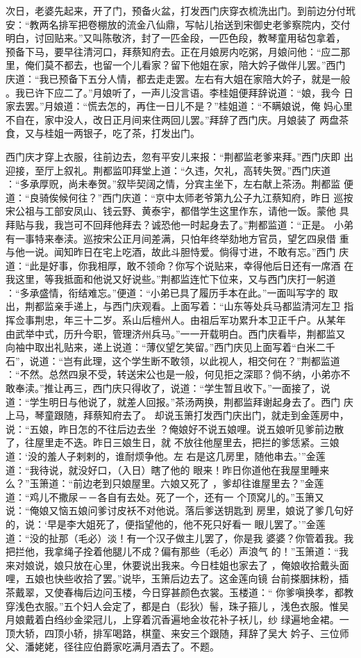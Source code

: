 次日，老婆先起来，开了门，预备火盆，打发西门庆穿衣梳洗出门。到前边分付玳
安：“教两名排军把卷棚放的流金八仙鼎，写帖儿抬送到宋御史老爹察院内，交付
明白，讨回贴来。”又叫陈敬济，封了一匹金段，一匹色段，教琴童用毡包拿着，
预备下马，要早往清河口，拜蔡知府去。正在月娘房内吃粥，月娘问他：“应二那
里，俺们莫不都去，也留一个儿看家？留下他姐在家，陪大妗子做伴儿罢。”西门
庆道：“我已预备下五分人情，都去走走罢。左右有大姐在家陪大妗子，就是一般
。我已许下应二了。”月娘听了，一声儿没言语。李桂姐便拜辞说道：“娘，我今
日家去罢。”月娘道：“慌去怎的，再住一日儿不是？”桂姐道：“不瞒娘说，俺
妈心里不自在，家中没人，改日正月间来住两回儿罢。”拜辞了西门庆。月娘装了
两盘茶食，又与桂姐一两银子，吃了茶，打发出门。

西门庆才穿上衣服，往前边去，忽有平安儿来报：“荆都监老爹来拜。”西门庆即
出迎接，至厅上叙礼。荆都监叩拜堂上道：“久违，欠礼，高转失贺。”西门庆道
：“多承厚贶，尚未奉贺。”叙毕契阔之情，分宾主坐下，左右献上茶汤。荆都监
便道：“良骑俟候何往？”西门庆道：“京中太师老爷第九公子九江蔡知府，昨日
巡按宋公祖与工部安凤山、钱云野、黄泰宇，都借学生这里作东，请他一饭。蒙他
具拜贴与我，我岂可不回拜他拜去？诚恐他一时起身去了。”荆都监道：“正是。
小弟有一事特来奉渎。巡按宋公正月间差满，只怕年终举劾地方官员，望乞四泉借
重与他一说。闻知昨日在宅上吃酒，故此斗胆恃爱。倘得寸进，不敢有忘。”西门
庆道：“此是好事，你我相厚，敢不领命？你写个说贴来，幸得他后日还有一席酒
在我这里，等我抵面和他说又好说些。”荆都监连忙下位来，又与西门庆打一躬道
：“多承盛情，衔结难忘。”便道：“小弟已具了履历手本在此。”一面叫写字的
取出，荆都监亲手递上，与西门庆观看。上面写着：“山东等处兵马都监清河左卫
指挥佥事荆忠，年三十二岁。系山后檀州人。由祖后军功累升本卫正千户。从某年
由武举中式，历升今职，管理济州兵马。”一一开载明白。西门庆看毕，荆都监又
向袖中取出礼贴来，递上说道：“薄仪望乞笑留。”西门庆见上面写着“白米二千
石”，说道：“岂有此理，这个学生断不敢领，以此视人，相交何在？”荆都监道
：“不然。总然四泉不受，转送宋公也是一般，何见拒之深耶？倘不纳，小弟亦不
敢奉渎。”推让再三，西门庆只得收了，说道：“学生暂且收下。”一面接了，说
道：“学生明日与他说了，就差人回报。”茶汤两换，荆都监拜谢起身去了。西门
庆上马，琴童跟随，拜蔡知府去了。
却说玉箫打发西门庆出门，就走到金莲房中，说：“五娘，昨日怎的不往后边去坐
？俺娘好不说五娘哩。说五娘听见爹前边散了，往屋里走不迭。昨日三娘生日，就
不放往他屋里去，把拦的爹恁紧。三娘道：‘没的羞人子剌剌的，谁耐烦争他。左
右是这几房里，随他串去。’”金莲道：“我待说，就没好口，（入日）瞎了他的
眼来！昨日你道他在我屋里睡来么？”玉箫道：“前边老到只娘屋里。六娘又死了
，爹却往谁屋里去？”金莲道：“鸡儿不撒尿－－各自有去处。死了一个，还有一
个顶窝儿的。”玉箫又说：“俺娘又恼五娘问爹讨皮袄不对他说。落后爹送钥匙到
房里，娘说了爹几句好的，说：‘早是李大姐死了，便指望他的，他不死只好看一
眼儿罢了。’”金莲道：“没的扯那（毛必）淡！有一个汉子做主儿罢了，你是我
婆婆？你管着我。我把拦他，我拿绳子拴着他腿儿不成？偏有那些（毛必）声浪气
的！”玉箫道：“我来对娘说，娘只放在心里，休要说出我来。今日桂姐也家去了
，俺娘收拾戴头面哩，五娘也快些收拾了罢。”说毕，玉箫后边去了。这金莲向镜
台前搽胭抹粉，插茶戴翠，又使春梅后边问玉楼，今日穿甚颜色衣裳。玉楼道：“
你爹嗔换孝，都教穿浅色衣服。”五个妇人会定了，都是白（髟狄）髻，珠子箍儿
，浅色衣服。惟吴月娘戴着白绉纱金梁冠儿，上穿着沉香遍地金妆花补子袄儿，纱
绿遍地金裙。一顶大轿，四顶小轿，排军喝路，棋童、来安三个跟随，拜辞了吴大
妗子、三位师父、潘姥姥，径往应伯爵家吃满月酒去了。不题。


